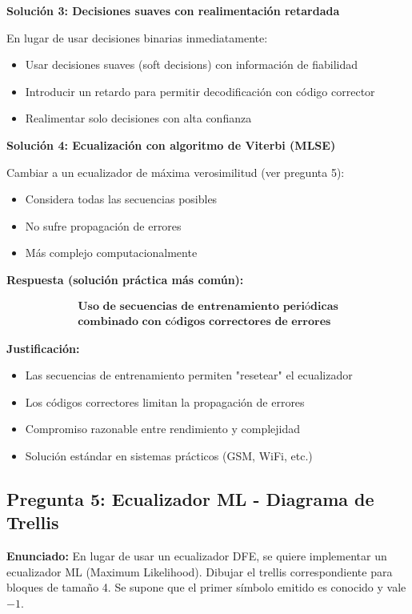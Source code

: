 \documentclass[11pt,a4paper]{article}
\begin{document}
\textbf{Solución 3: Decisiones suaves con realimentación retardada}

En lugar de usar decisiones binarias inmediatamente:
\begin{itemize}
    \item Usar decisiones suaves (soft decisions) con información de fiabilidad
    \item Introducir un retardo para permitir decodificación con código corrector
    \item Realimentar solo decisiones con alta confianza
\end{itemize}

\textbf{Solución 4: Ecualización con algoritmo de Viterbi (MLSE)}

Cambiar a un ecualizador de máxima verosimilitud (ver pregunta 5):
\begin{itemize}
    \item Considera todas las secuencias posibles
    \item No sufre propagación de errores
    \item Más complejo computacionalmente
\end{itemize}

\textbf{Respuesta (solución práctica más común):}

\[
\boxed{\begin{array}{l}
\textbf{Uso de secuencias de entrenamiento periódicas} \\
\textbf{combinado con códigos correctores de errores}
\end{array}}
\]

\textbf{Justificación:}
\begin{itemize}
    \item Las secuencias de entrenamiento permiten "resetear" el ecualizador
    \item Los códigos correctores limitan la propagación de errores
    \item Compromiso razonable entre rendimiento y complejidad
    \item Solución estándar en sistemas prácticos (GSM, WiFi, etc.)
\end{itemize}

\subsection*{Pregunta 5: Ecualizador ML - Diagrama de Trellis}

\textbf{Enunciado:} En lugar de usar un ecualizador DFE, se quiere implementar un ecualizador ML (Maximum Likelihood). Dibujar el trellis correspondiente para bloques de tamaño 4. Se supone que el primer símbolo emitido es conocido y vale $-1$.
\end{document}
